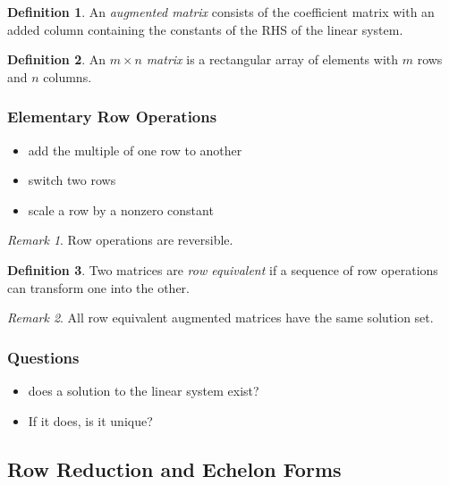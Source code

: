 \documentclass{article}
\theoremstyle{definition}
\newtheorem{definition}{Definition}[section]
\theoremstyle{remark}
\newtheorem*{remark}{Remark}
\theoremstyle{remark}
\theoremstyle{remark}
\newtheorem*{it follows}{It follows}
\begin{document}
\begin{definition}
  An \textit{augmented matrix} consists of the coefficient matrix with an added column containing the constants of the RHS of the linear system.
\end{definition}

\begin{definition}
  An $m \times n$ \textit{matrix} is a rectangular array of elements with $m$ rows and $n$ columns.
\end{definition}

\subsubsection{Elementary Row Operations}

\begin{itemize}
  \item add the multiple of one row to another
  \item switch two rows
  \item scale a row by a nonzero constant
\end{itemize}

\begin{remark}
  Row operations are reversible.
\end{remark}

\begin{definition}
  Two matrices are \textit{row equivalent} if a sequence of row operations can transform one into the other.
\end{definition}

\begin{remark}
  All row equivalent augmented matrices have the same solution set.
\end{remark}

\subsubsection{Questions}

\begin{itemize}
  \item does a solution to the linear system exist?
  \item If it does, is it unique?
\end{itemize}

\subsection{Row Reduction and Echelon Forms}
\end{document}
